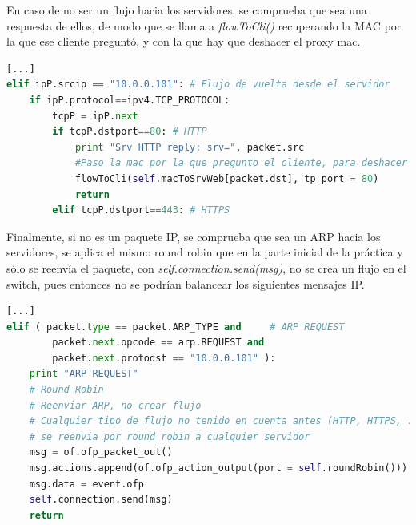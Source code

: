 \documentclass{article}
\begin{document}
En caso de no ser un flujo hacia los servidores, se comprueba que sea una respuesta de ellos, de modo que se llama a \textit{flowToCli()} recuperando la MAC por la que ese cliente preguntó, y con la que hay que deshacer el proxy mac.

\begin{lstlisting}[language=Python]
[...]
elif ipP.srcip == "10.0.0.101": # Flujo de vuelta desde el servidor
	if ipP.protocol==ipv4.TCP_PROTOCOL:
		tcpP = ipP.next
		if tcpP.dstport==80: # HTTP
			print "Srv HTTP reply: srv=", packet.src
			#Paso la mac por la que pregunto el cliente, para deshacer proxy mac
			flowToCli(self.macToSrvWeb[packet.dst], tp_port = 80)
			return
		elif tcpP.dstport==443: # HTTPS
\end{lstlisting}

Finalmente, si no es un paquete IP, se comprueba que sea un ARP hacia los servidores, se aplica el mismo round robin que en la parte inicial de la práctica y sólo se reenvía el paquete, con \textit{self.connection.send(msg)}, no se crea un flujo en el switch, pues entonces no se podrían balancear los siguientes mensajes IP.

\begin{lstlisting}[language=Python]
[...]
elif ( packet.type == packet.ARP_TYPE and     # ARP REQUEST
		packet.next.opcode == arp.REQUEST and
		packet.next.protodst == "10.0.0.101" ):
	print "ARP REQUEST"
	# Round-Robin
	# Reenviar ARP, no crear flujo
	# Cualquier tipo de flujo no tenido en cuenta antes (HTTP, HTTPS, ...)
	# se reenvia por round robin a cualquier servidor
	msg = of.ofp_packet_out()
	msg.actions.append(of.ofp_action_output(port = self.roundRobin()))
	msg.data = event.ofp
	self.connection.send(msg)
	return
\end{lstlisting}








\appendix
\end{document}
